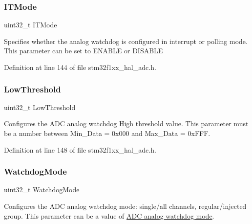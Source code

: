 \subsubsection{\texorpdfstring{I\+T\+Mode}{ITMode}}
{\footnotesize\ttfamily uint32\+\_\+t I\+T\+Mode}

Specifies whether the analog watchdog is configured in interrupt or polling mode. This parameter can be set to E\+N\+A\+B\+LE or D\+I\+S\+A\+B\+LE 

Definition at line 144 of file stm32f1xx\+\_\+hal\+\_\+adc.\+h.

\mbox{\label{struct_a_d_c___analog_w_d_g_conf_type_def_a018c772cad96f1f0493ec0019ecc08f9}} 
\subsubsection{\texorpdfstring{Low\+Threshold}{LowThreshold}}
{\footnotesize\ttfamily uint32\+\_\+t Low\+Threshold}

Configures the A\+DC analog watchdog High threshold value. This parameter must be a number between Min\+\_\+\+Data = 0x000 and Max\+\_\+\+Data = 0x\+F\+FF. 

Definition at line 148 of file stm32f1xx\+\_\+hal\+\_\+adc.\+h.

\mbox{\label{struct_a_d_c___analog_w_d_g_conf_type_def_a13924e920be2454c955a2139e2c3eb1a}} 
\subsubsection{\texorpdfstring{Watchdog\+Mode}{WatchdogMode}}
{\footnotesize\ttfamily uint32\+\_\+t Watchdog\+Mode}

Configures the A\+DC analog watchdog mode\+: single/all channels, regular/injected group. This parameter can be a value of \hyperlink{group___a_d_c__analog__watchdog__mode}{A\+DC analog watchdog mode}. 

